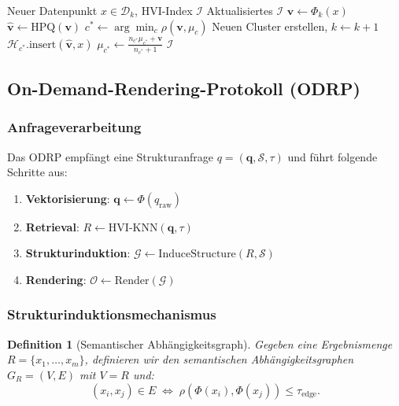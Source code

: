 ﻿\documentclass[12pt,a4paper]{article}
\newtheorem{definition}[theorem]{Definition}
\begin{document}
\begin{algorithm}[ht]
\small
\caption{HVI-Inkrementell-Einfügung}
\label{alg:insert}
\begin{algorithmic}[1]
\Require Neuer Datenpunkt $x \in \mathcal{D}_k$, HVI-Index $\mathcal{I}$
\Ensure Aktualisiertes $\mathcal{I}$
\State $\mathbf{v} \gets \Phi_k(x)$ 
\State $\hat{\mathbf{v}} \gets \text{HPQ}(\mathbf{v})$ 
\State $c^* \gets \arg\min_c \rho(\mathbf{v}, \mu_c)$ 
  \State Neuen Cluster erstellen, $k \gets k+1$
\Else
  \State $\mathcal{H}_{c^*}.\text{insert}(\hat{\mathbf{v}}, x)$
  \State $\mu_{c^*} \gets \frac{n_{c^*}\mu_{c^*} + \mathbf{v}}{n_{c^*}+1}$
\EndIf
\State \Return $\mathcal{I}$
\end{algorithmic}
\end{algorithm}

\subsection{On-Demand-Rendering-Protokoll (ODRP)}
\label{sec:odrp}

\subsubsection{Anfrageverarbeitung}

Das ODRP empfängt eine Strukturanfrage $q = (\mathbf{q}, \mathcal{S}, \tau)$ 
und führt folgende Schritte aus:

\begin{enumerate}[leftmargin=1.2em, itemsep=2pt, topsep=2pt]
  \item \textbf{Vektorisierung}: $\mathbf{q} \gets \Phi(q_{\text{raw}})$
  \item \textbf{Retrieval}: $R \gets \text{HVI-KNN}(\mathbf{q}, \tau)$
  \item \textbf{Strukturinduktion}: $\mathcal{G} \gets \text{InduceStructure}(R, \mathcal{S})$
  \item \textbf{Rendering}: $\mathcal{O} \gets \text{Render}(\mathcal{G})$
\end{enumerate}

\subsubsection{Strukturinduktionsmechanismus}

\begin{definition}[Semantischer Abhängigkeitsgraph]
\label{def:depgraph}
Gegeben eine Ergebnismenge $R = \{x_1, \ldots, x_m\}$, definieren 
wir den semantischen Abhängigkeitsgraphen 
$G_R = (V, E)$ mit $V = R$ und:
\[
  (x_i, x_j) \in E \;\Longleftrightarrow\;
  \rho(\Phi(x_i), \Phi(x_j)) \leq \tau_{\text{edge}}.
\]
\end{definition}
\end{document}
